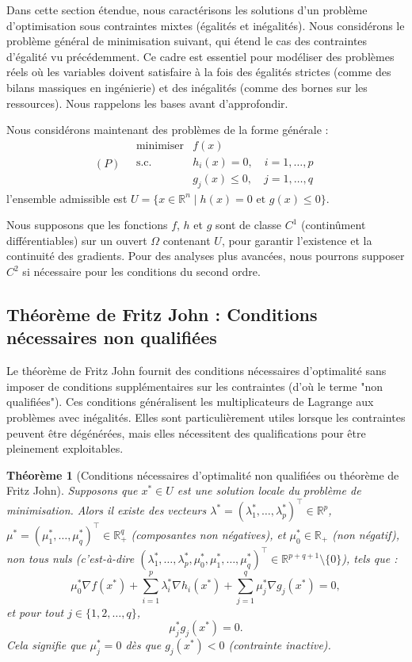 \documentclass[a4paper,12pt,openany]{book}
\theoremstyle{plain}
\newtheorem{theorem}{Théorème}[section]
\theoremstyle{definition}
\theoremstyle{remark}
\theoremstyle{nbstyle}
\begin{document}
	Dans cette section étendue, nous caractérisons les solutions d'un problème d'optimisation sous contraintes mixtes (égalités et inégalités). Nous considérons le problème général de minimisation suivant, qui étend le cas des contraintes d'égalité vu précédemment. Ce cadre est essentiel pour modéliser des problèmes réels où les variables doivent satisfaire à la fois des égalités strictes (comme des bilans massiques en ingénierie) et des inégalités (comme des bornes sur les ressources). Nous rappelons les bases avant d'approfondir.
	
	Nous considérons maintenant des problèmes de la forme générale :
	$$
	(P) \quad
	\begin{array}{ll}
	\text{minimiser} & f(x) \\
	\text{s.c.} & h_i(x) = 0, \quad i=1, \dots, p \\
	& g_j(x) \le 0, \quad j=1, \dots, q
	\end{array}
	$$
	l'ensemble admissible est $U=\{x\in\mathbb{R}^{n} \mid h(x)=0 \text{ et } g(x)\le0\}$.
	
	
	Nous supposons que les fonctions \( f \), \( h \) et \( g \) sont de classe \( C^1 \) (continûment différentiables) sur un ouvert \( \Omega \) contenant \( U \), pour garantir l'existence et la continuité des gradients. Pour des analyses plus avancées, nous pourrons supposer \( C^2 \) si nécessaire pour les conditions du second ordre.
	
	\subsection{Théorème de Fritz John : Conditions nécessaires non qualifiées}
	
	Le théorème de Fritz John fournit des conditions nécessaires d'optimalité sans imposer de conditions supplémentaires sur les contraintes (d'où le terme "non qualifiées"). Ces conditions généralisent les multiplicateurs de Lagrange aux problèmes avec inégalités. Elles sont particulièrement utiles lorsque les contraintes peuvent être dégénérées, mais elles nécessitent des qualifications pour être pleinement exploitables.
	
	\begin{theorem}[Conditions nécessaires d'optimalité non qualifiées ou théorème de Fritz John]\label{theo4.1.1}
		Supposons que \( x^* \in U \) est une solution locale du problème de minimisation. Alors il existe des vecteurs \( \lambda^* = (\lambda^*_1, \dots, \lambda^*_p)^\top \in \mathbb{R}^p \), \( \mu^* = (\mu^*_1, \dots, \mu^*_q)^\top \in \mathbb{R}^q_+ \) (composantes non négatives), et \( \mu^*_0 \in \mathbb{R}_+ \) (non négatif), non tous nuls (c'est-à-dire \( (\lambda^*_1, \dots, \lambda^*_p, \mu^*_0, \mu^*_1, \dots, \mu^*_q)^\top \in \mathbb{R}^{p+q+1} \setminus \{0\} \)), tels que :
		\[
		\mu^*_0 \nabla f(x^*) + \sum_{i=1}^p \lambda^*_i \nabla h_i(x^*) + \sum_{j=1}^q \mu^*_j \nabla g_j(x^*) = 0,
		\]
		et pour tout \( j \in \{1, 2, \dots, q\} \),
		\[
		\mu^*_j g_j(x^*) = 0.
		\]
		Cela signifie que \( \mu^*_j = 0 \) dès que \( g_j(x^*) < 0 \) (contrainte inactive).
	\end{theorem}
	
\end{document}

